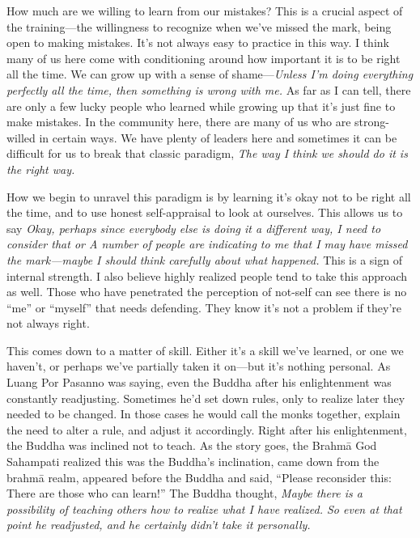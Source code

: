 
How much are we willing to learn from our mistakes? This is a crucial 
aspect of the training---the willingness to recognize when we've missed 
the mark, being open to making mistakes. It's not always easy to 
practice in this way. I think many of us here come with conditioning 
around how important it is to be right all the time. We can grow up 
with a sense of shame---\emph{Unless I'm doing everything perfectly all 
the time, then something is wrong with me.} As far as I can tell, there 
are only a few lucky people who learned while growing up that it's just 
fine to make mistakes. In the community here, there are many of us who 
are strong-willed in certain ways. We have plenty of leaders here and 
sometimes it can be difficult for us to break that classic paradigm, 
\emph{The way I think we should do it is the right way.}

How we begin to unravel this paradigm is by learning it's okay not to 
be right all the time, and to use honest self-appraisal to look at 
ourselves. This allows us to say \emph{Okay, perhaps since everybody 
else is doing it a different way, I need to consider that or A number 
of people are indicating to me that I may have missed the mark---maybe 
I should think carefully about what happened.} This is a sign of 
internal strength. I also believe highly realized people tend to take 
this approach as well. Those who have penetrated the perception of 
not-self can see there is no ``me'' or ``myself'' that needs defending. 
They know it's not a problem if they're not always right.

This comes down to a matter of skill. Either it's a skill we've 
learned, or one we haven't, or perhaps we've partially taken it 
on---but it's nothing personal. As Luang Por Pasanno was saying, even 
the Buddha after his enlightenment was constantly readjusting. 
Sometimes he'd set down rules, only to realize later they needed to be 
changed. In those cases he would call the monks together, explain the 
need to alter a rule, and adjust it accordingly. Right after his 
enlightenment, the Buddha was inclined not to teach. As the story goes, 
the Brahmā God Sahampati realized this was the Buddha's inclination, 
came down from the brahmā realm, appeared before the Buddha and said, 
``Please reconsider this: There are those who can learn!'' The Buddha 
thought, \emph{Maybe there is a possibility of teaching others how to 
realize what I have realized. So even at that point he readjusted, and 
he certainly didn't take it personally.}

